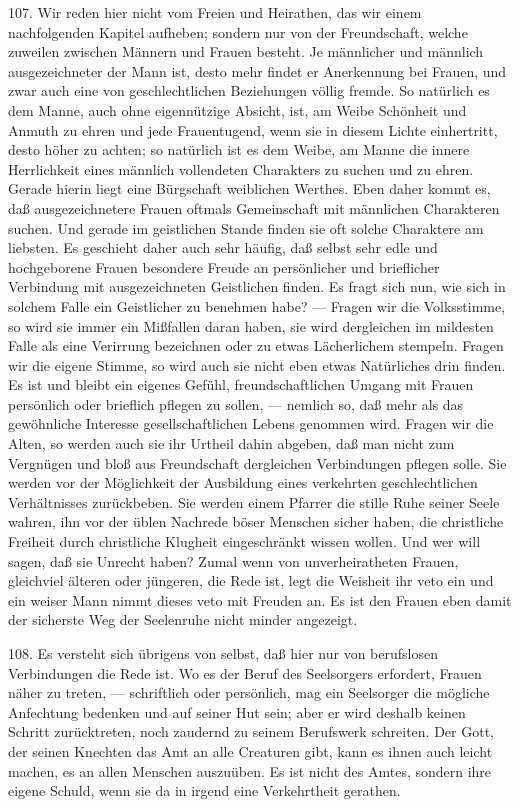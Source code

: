 107. Wir reden hier nicht vom Freien und Heirathen, das wir einem nachfolgenden Kapitel aufheben; sondern nur von der Freundschaft, welche zuweilen zwischen Männern und Frauen besteht. Je männlicher und männlich ausgezeichneter der Mann ist, desto mehr findet er Anerkennung bei Frauen, und zwar auch eine von geschlechtlichen Beziehungen völlig fremde. So natürlich es dem Manne, auch ohne eigennützige Absicht, ist, am Weibe Schönheit und Anmuth zu ehren und jede Frauentugend, wenn sie in diesem Lichte einhertritt, desto höher zu achten; so natürlich ist es dem Weibe, am Manne die innere Herrlichkeit eines männlich vollendeten Charakters zu suchen und zu ehren. Gerade hierin liegt eine Bürgschaft weiblichen Werthes. Eben daher kommt es, daß ausgezeichnetere Frauen oftmals Gemeinschaft mit männlichen Charakteren suchen. Und gerade im geistlichen Stande finden sie oft solche Charaktere am liebsten. Es geschieht daher auch sehr häufig, daß selbst sehr edle und hochgeborene Frauen besondere Freude an persönlicher und brieflicher Verbindung
mit ausgezeichneten Geistlichen finden. Es fragt sich nun, wie sich in solchem Falle ein Geistlicher zu benehmen habe? — Fragen wir die Volksstimme, so wird sie immer ein Mißfallen daran haben, sie wird dergleichen im mildesten Falle als eine Verirrung bezeichnen oder zu etwas Lächerlichem stempeln. Fragen wir die eigene Stimme, so wird auch sie nicht eben etwas Natürliches drin finden. Es ist und bleibt ein eigenes Gefühl, freundschaftlichen Umgang mit Frauen persönlich oder brieflich pflegen zu sollen, — nemlich so, daß mehr als das gewöhnliche Interesse gesellschaftlichen Lebens genommen wird. Fragen wir die Alten, so werden auch sie ihr Urtheil dahin abgeben, daß man nicht zum Vergnügen und bloß aus Freundschaft dergleichen Verbindungen pflegen solle. Sie werden vor der Möglichkeit der Ausbildung eines verkehrten geschlechtlichen Verhältnisses zurückbeben. Sie werden einem Pfarrer die stille Ruhe seiner Seele wahren, ihn vor der üblen Nachrede böser Menschen sicher haben, die christliche Freiheit durch christliche Klugheit eingeschränkt wissen wollen. Und wer will sagen, daß sie Unrecht haben? Zumal wenn von unverheiratheten Frauen, gleichviel älteren oder jüngeren, die Rede ist, legt die Weisheit ihr veto ein und ein weiser Mann nimmt dieses veto mit Freuden an. Es ist den Frauen eben damit der sicherste Weg der Seelenruhe nicht minder angezeigt.

108. Es versteht sich übrigens von selbst, daß hier nur von berufslosen Verbindungen die Rede ist. Wo es der Beruf des Seelsorgers erfordert, Frauen näher zu treten, — schriftlich oder persönlich, mag ein Seelsorger
die mögliche Anfechtung bedenken und auf seiner Hut sein; aber er wird deshalb keinen Schritt zurücktreten, noch zaudernd zu seinem Berufswerk schreiten. Der Gott, der seinen Knechten das Amt an alle Creaturen gibt, kann es ihnen auch leicht machen, es an allen Menschen auszuüben. Es ist nicht des Amtes, sondern ihre eigene Schuld, wenn sie da in irgend eine Verkehrtheit gerathen.


